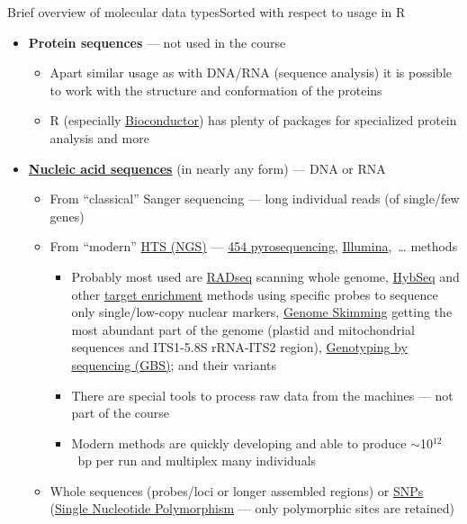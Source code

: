 \documentclass[compress, ucs, xelatex, 11pt, xcolor=svgnames, aspectratio=169,
	hyperref={
		bookmarks=true,
		unicode=true,
		colorlinks=true,
		pdftitle={Molecular data in R},
		plainpages=false,
		pdfauthor={Vojtech Zeisek},
		pdfsubject={Course about phylogeny and evolution in R},
		pdfcreator={XeLaTeX},
		pdfkeywords={R, evolution, phylogeny, molecular data},
		linkcolor=Crimson, %
		anchorcolor=Magenta, %
		citecolor=Magenta, %
		filecolor=Magenta, %
		menucolor=Magenta, %
		urlcolor=DodgerBlue, %
		pdftex},
	url={hyphens, lowtilde} %
	]{beamer}
\begin{document}
\begin{frame}[allowframebreaks]{Brief overview of molecular data types}{Sorted with respect to usage in R}
\begin{itemize}
\begin{itemize}
\begin{itemize}
			\end{itemize}
		\end{itemize}
		\item \textbf{Protein sequences} --- not used in the course
		\begin{itemize}
			\item Apart similar usage as with DNA/RNA (sequence analysis) it is possible to work with the structure and conformation of the proteins
			\item R (especially \href{https://bioconductor.org/}{Bioconductor}) has plenty of packages for specialized protein analysis and more
		\end{itemize}
		\item \textbf{\href{https://en.wikipedia.org/wiki/Nucleic_acid_sequence}{Nucleic acid sequences}} (in nearly any form) --- DNA or RNA
		\begin{itemize}
			\item From \enquote{classical} Sanger sequencing --- long individual reads (of single/few genes)
			\item From \enquote{modern} \href{https://en.wikipedia.org/wiki/DNA_sequencing\#High-throughput_methods}{HTS (NGS)} --- \href{https://en.wikipedia.org/wiki/Pyrosequencing}{454 pyrosequencing}, \href{https://en.wikipedia.org/wiki/Illumina_dye_sequencing}{Illumina},~\ldots{ }methods
			\begin{itemize}
				\item Probably most used are \href{https://en.wikipedia.org/wiki/Restriction_site_associated_DNA_markers}{RADseq} scanning whole genome, \href{https://bsapubs.onlinelibrary.wiley.com/doi/abs/10.3732/apps.1400042}{HybSeq} and other \href{https://en.wikipedia.org/wiki/Exome_sequencing}{target enrichment} methods using specific probes to sequence only single/low-copy nuclear markers, \href{https://bsapubs.onlinelibrary.wiley.com/doi/abs/10.3732/ajb.1100335}{Genome Skimming} getting the most abundant part of the genome (plastid and mitochondrial sequences and ITS1-5.8S rRNA-ITS2 region), \href{https://en.wikipedia.org/wiki/Genotyping_by_sequencing}{Genotyping by sequencing (GBS)}; and their variants
				\item There are special tools to process raw data from the machines --- not part of the course
				\item Modern methods are quickly developing and able to produce $\sim$10$^{12}$~bp per run and multiplex many individuals
			\end{itemize}
			\item Whole sequences (probes/loci or longer assembled regions) or \href{https://en.wikipedia.org/wiki/Single-nucleotide_polymorphism}{SNPs} (\href{https://en.wikipedia.org/wiki/SNP_genotyping}{Single Nucleotide Polymorphism} --- only polymorphic sites are retained)

\end{itemize}
\end{itemize}
\end{frame}
\end{document}
